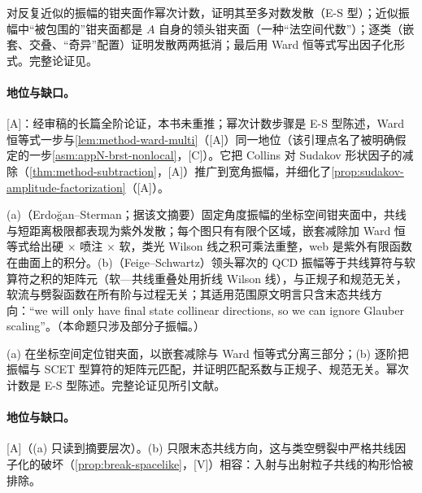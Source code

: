 \begin{proofsketch}
对反复近似的振幅的钳夹面作幂次计数，证明其至多对数发散（E-S 型）；近似振幅中“被包围的”钳夹面都是 $A$ 自身的领头钳夹面（一种“法空间代数”）；逐类（嵌套、交叠、“奇异”配置）证明发散两两抵消；最后用 Ward 恒等式写出因子化形式。完整论证见\cite{Ma2020}。
\end{proofsketch}

\paragraph{地位与缺口。}[A]：经审稿的长篇全阶论证，本书未重推；幂次计数步骤是 E-S 型陈述，Ward 恒等式一步与\cref{lem:method-ward-multi}（[A]）同一地位（该引理点名了被明确假定的一步\cref{asm:appN-brst-nonlocal}，[C]）。它把 Collins 对 Sudakov 形状因子的减除（\cref{thm:method-subtraction}，[A]）推广到宽角振幅，并细化了\cref{prop:sudakov-amplitude-factorization}（[A]）。

\begin{proposition}\label{prop:front-coordinate-space}\hfill\break
(a)（Erdoğan--Sterman；据该文摘要）固定角度振幅的坐标空间钳夹面中，共线与短距离极限都表现为紫外发散；每个图只有有限个区域，嵌套减除加 Ward 恒等式给出硬 $\times$ 喷注 $\times$ 软，类光 Wilson 线之积可乘法重整，web 是紫外有限函数在曲面上的积分\cite{Erdogan:2013bga,Erdogan:2014gha,Erdogan:2017gyf,Sterman:2025qsq}。(b)（Feige--Schwartz）领头幂次的 QCD 振幅等于共线算符与软算符之积的矩阵元（软—共线重叠处用折线 Wilson 线），与正规子和规范无关，软流与劈裂函数在所有阶与过程无关；其适用范围原文明言只含末态共线方向：“we will only have final state collinear directions, so we can ignore Glauber scaling”\cite{FeigeSchwartz2014}。（本命题只涉及部分子振幅。）
\end{proposition}

\begin{proofsketch}
(a) 在坐标空间定位钳夹面，以嵌套减除与 Ward 恒等式分离三部分；(b) 逐阶把振幅与 SCET 型算符的矩阵元匹配，并证明匹配系数与正规子、规范无关。幂次计数是 E-S 型陈述。完整论证见所引文献。
\end{proofsketch}

\paragraph{地位与缺口。}[A]（(a) 只读到摘要层次）。(b) 只限末态共线方向，这与类空劈裂中严格共线因子化的破坏（\cref{prop:break-spacelike}，[V]）相容：入射与出射粒子共线的构形恰被排除。


